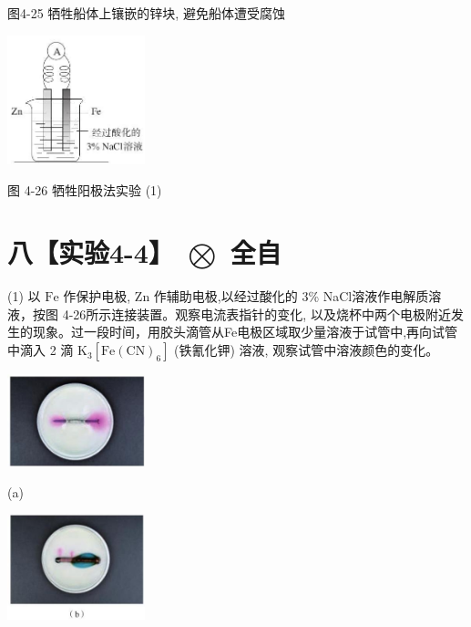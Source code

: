 \documentclass[10pt]{article}
\begin{document}
图4-25 牺牲船体上镶嵌的锌块, 避免船体遭受腐蚀

\begin{center}
\includegraphics[max width=0.3\textwidth]{images/0190da9d-8bfd-732f-bc2c-0b21d0f13b91_119_653341.jpg}
\end{center}

图 4-26 牺牲阳极法实验 (1)

\section*{八【实验4-4】 \(\bigotimes\) 全自}

(1) 以 \(\mathrm{{Fe}}\) 作保护电极, \(\mathrm{{Zn}}\) 作辅助电极,以经过酸化的 3\% NaCl溶液作电解质溶液，按图 4-26所示连接装置。观察电流表指针的变化, 以及烧杯中两个电极附近发生的现象。过一段时间，用胶头滴管从Fe电极区域取少量溶液于试管中,再向试管中滴入 2 滴 \({\mathrm{K}}_{3}\left\lbrack {\mathrm{{Fe}}{\left( \mathrm{{CN}}\right) }_{6}}\right\rbrack\) (铁氰化钾) 溶液, 观察试管中溶液颜色的变化。

\begin{center}
\includegraphics[max width=0.3\textwidth]{images/0190da9d-8bfd-732f-bc2c-0b21d0f13b91_119_211022.jpg}
\end{center}

(a)

\begin{center}
\includegraphics[max width=0.3\textwidth]{images/0190da9d-8bfd-732f-bc2c-0b21d0f13b91_119_341390.jpg}
\end{center}
\end{document}

